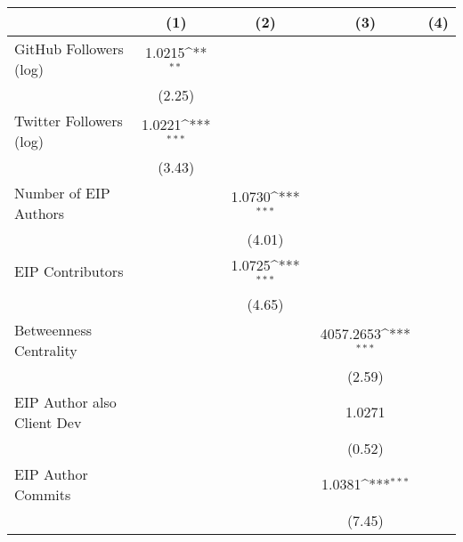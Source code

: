 {
\def\sym#1{\ifmmode^{#1}\else\(^{#1}\)\fi}
\begin{tabular}{l*{4}{c}}
\hline\hline
                                   &\multicolumn{1}{c}{(1)}         &\multicolumn{1}{c}{(2)}         &\multicolumn{1}{c}{(3)}         &\multicolumn{1}{c}{(4)}         \\
\hline
GitHub Followers (log)             &      1.0215\sym{**} &                     &                     &                     \\
                                   &      (2.25)         &                     &                     &                     \\
[1em]
Twitter Followers (log)            &      1.0221\sym{***}&                     &                     &                     \\
                                   &      (3.43)         &                     &                     &                     \\
[1em]
Number of EIP Authors              &                     &      1.0730\sym{***}&                     &                     \\
                                   &                     &      (4.01)         &                     &                     \\
[1em]
EIP Contributors                   &                     &      1.0725\sym{***}&                     &                     \\
                                   &                     &      (4.65)         &                     &                     \\
[1em]
Betweenness Centrality             &                     &                     &   4057.2653\sym{***}&                     \\
                                   &                     &                     &      (2.59)         &                     \\
[1em]
EIP Author also Client Dev         &                     &                     &      1.0271         &                     \\
                                   &                     &                     &      (0.52)         &                     \\
[1em]
EIP Author Commits                 &                     &                     &      1.0381\sym{***}&                     \\
                                   &                     &                     &      (7.45)         &                     \\

\end{tabular}}
